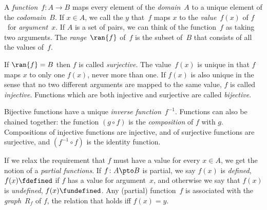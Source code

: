 A \emph{function}~$f\colon A \to B$ maps every element of the
\emph{domain}~$A$ to a unique element of the \emph{codomain}~$B$. If
$x \in A$, we call the $y$ that~$f$ maps $x$ to the
\emph{value}~$f(x)$ of $f$~for \emph{argument}~$x$. If $A$ is a set of
pairs, we can think of the function~$f$ as taking two arguments. The
\emph{range}~$\ran{f}$ of~$f$ is the subset of~$B$ that consists of
all the values of~$f$.

If $\ran{f} = B$ then $f$ is called \emph{surjective}. The value~$f(x)$
is unique in that $f$ maps $x$ to only one $f(x)$, never more than one.
If $f(x)$ is also unique in the sense that no two different arguments
are mapped to the same value, $f$ is called \emph{injective}. Functions
which are both injective and surjective are called \emph{bijective}.

Bijective functions have a unique \emph{inverse function}~$f^{-1}$.
Functions can also be chained together: the function $(g \circ f)$ is
the \emph{composition} of $f$ with $g$. Compositions of injective
functions are injective, and of surjective functions are surjective,
and $(f^{-1} \circ f)$ is the identity function.

If we relax the requirement that $f$ must have a value for every $x
\in A$, we get the notion of a \emph{partial functions}. If $f\colon
A \pto B$ is partial, we say $f(x)$ is \emph{defined},
$f(x) \fdefined$ if $f$ has a value for argument~$x$, and otherwise we
say that $f(x)$ is \emph{undefined}, $f(x) \fundefined$. Any (partial)
function~$f$ is associated with the \emph{graph}~$R_f$ of $f$, the
relation that holds iff $f(x) = y$.
